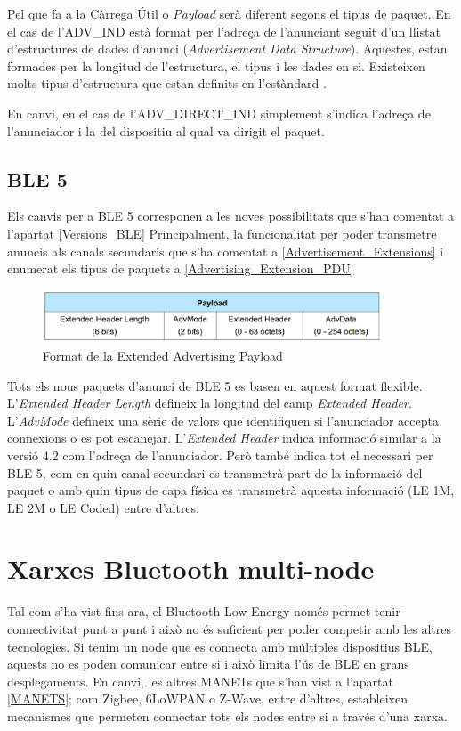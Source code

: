 Pel que fa a la Càrrega Útil o \textit{Payload} serà diferent segons el tipus de paquet.
En el cas de l'ADV\_IND està format per l'adreça de l'anunciant seguit d'un llistat d'estructures de dades d'anunci (\textit{Advertisement Data Structure}).
Aquestes, estan formades per la longitud de l'estructura, el tipus i les dades en si.
Existeixen molts tipus d'estructura que estan definits en l'estàndard \cite{AD_Types}.

En canvi, en el cas de l'ADV\_DIRECT\_IND simplement s'indica l'adreça de l'anunciador i la del dispositiu al qual va dirigit el paquet.

\subsection{BLE 5}
Els canvis per a BLE 5 corresponen a les noves possibilitats que s'han comentat a l'apartat \ref{Versions_BLE}
Principalment, la funcionalitat per poder transmetre anuncis als canals secundaris que s'ha comentat a \ref{Advertisement_Extensions} i enumerat els tipus de paquets a \ref{Advertising_Extension_PDU}

\begin{figure}[!h]
	\begin{center}
		\includegraphics[width=0.9\textwidth]{./images/Common_Extended_Advertising_Payload_Format.png}
		\caption{Format de la Extended Advertising Payload \cite{BLE_5_Extended_Advertising}}
	\end{center}
\end{figure}

Tots els nous paquets d'anunci de BLE 5 es basen en aquest format flexible.
L'\textit{Extended Header Length} defineix la longitud del camp \textit{Extended Header}.
L'\textit{AdvMode} defineix una sèrie de valors que identifiquen si l'anunciador accepta connexions o es pot escanejar.
L'\textit{Extended Header} indica informació similar a la versió 4.2 com l'adreça de l'anunciador.
Però també indica tot el necessari per BLE 5, com en quin canal secundari es transmetrà part de la informació del paquet o amb quin tipus de capa física es transmetrà aquesta informació (LE 1M, LE 2M o LE Coded) entre d'altres.

\section{Xarxes Bluetooth multi-node}
Tal com s'ha vist fins ara, el Bluetooth Low Energy només permet tenir connectivitat punt a punt i això no és suficient per poder competir amb les altres tecnologies.
Si tenim un node que es connecta amb múltiples dispositius BLE, aquests no es poden comunicar entre si i això limita l'ús de BLE en grans desplegaments.
En canvi, les altres MANETs que s'han vist a l'apartat \ref{MANETS}; com Zigbee, 6LoWPAN o Z-Wave, entre d'altres, estableixen mecanismes que permeten connectar tots els nodes entre si a través d'una xarxa.

